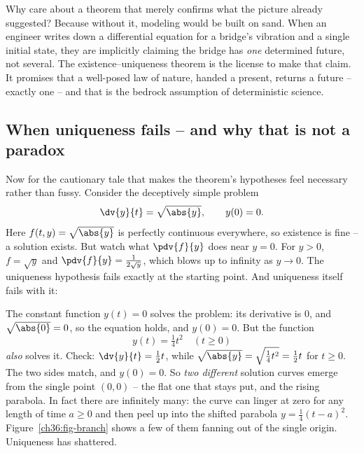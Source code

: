 Why care about a theorem that merely confirms what the picture already suggested? Because without it, modeling would be built on sand. When an engineer writes down a differential equation for a bridge's vibration and a single initial state, they are implicitly claiming the bridge has \emph{one} determined future, not several. The existence--uniqueness theorem is the license to make that claim. It promises that a well-posed law of nature, handed a present, returns a future -- exactly one -- and that is the bedrock assumption of deterministic science.

\subsection{When uniqueness fails -- and why that is not a paradox}

Now for the cautionary tale that makes the theorem's hypotheses feel necessary rather than fussy. Consider the deceptively simple problem
\[
  \dv{y}{t} = \sqrt{\abs{y}}, \qquad y(0) = 0.
\]
Here $f(t,y) = \sqrt{\abs{y}}$ is perfectly continuous everywhere, so existence is fine -- a solution exists. But watch what $\pdv{f}{y}$ does near $y=0$. For $y>0$, $f = \sqrt{y}$ and $\pdv{f}{y} = \tfrac{1}{2\sqrt{y}}$, which blows up to infinity as $y\to 0$. The uniqueness hypothesis fails exactly at the starting point. And uniqueness itself fails with it:

\begin{example}
\label{ch36:ex-nonunique}
The constant function $y(t) = 0$ solves the problem: its derivative is $0$, and $\sqrt{\abs{0}} = 0$, so the equation holds, and $y(0)=0$. But the function
\[
  y(t) = \tfrac{1}{4}t^2 \quad (t \ge 0)
\]
\emph{also} solves it. Check: $\dv{y}{t} = \tfrac{1}{2}t$, while $\sqrt{\abs{y}} = \sqrt{\tfrac{1}{4}t^2} = \tfrac{1}{2}t$ for $t\ge 0$. The two sides match, and $y(0)=0$. So \emph{two different} solution curves emerge from the single point $(0,0)$ -- the flat one that stays put, and the rising parabola. In fact there are infinitely many: the curve can linger at zero for any length of time $a\ge 0$ and then peel up into the shifted parabola $y=\tfrac14(t-a)^2$. Figure~\ref{ch36:fig-branch} shows a few of them fanning out of the single origin. Uniqueness has shattered.
\end{example}

